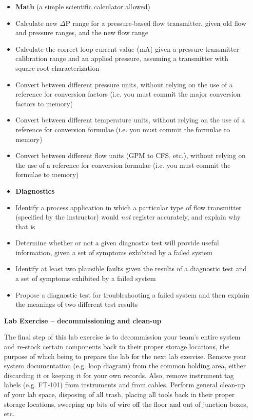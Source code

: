 \begin{itemize}
\item{} {\bf Math} (a simple scientific calculator  allowed)
\item{} Calculate new $\Delta$P range for a pressure-based flow transmitter, given old flow and pressure ranges, and the new flow range
\item{} Calculate the correct loop current value (mA) given a pressure transmitter calibration range and an applied pressure, assuming a transmitter with square-root characterization
\item{} Convert between different pressure units, without relying on the use of a reference for conversion factors (i.e. you must commit the major conversion factors to memory)
\item{} Convert between different temperature units, without relying on the use of a reference for conversion formulae (i.e. you must commit the formulae to memory)
\item{} Convert between different flow units (GPM to CFS, etc.), without relying on the use of a reference for conversion formulae (i.e. you must commit the formulae to memory)
\end{itemize}

\filbreak

\begin{itemize}
\item{} {\bf Diagnostics}
\item{} Identify a process application in which a particular type of flow transmitter (specified by the instructor) would {\it not} register accurately, and explain why that is
\item{} Determine whether or not a given diagnostic test will provide useful information, given a set of symptoms exhibited by a failed system
\item{} Identify at least two plausible faults given the results of a diagnostic test and a set of symptoms exhibited by a failed system
\item{} Propose a diagnostic test for troubleshooting a failed system and then explain the meanings of two different test results
\end{itemize}



\vfil \eject

\noindent
{\bf Lab Exercise -- decommissioning and clean-up}

\vskip 5pt

The final step of this lab exercise is to decommission your team's entire system and re-stock certain components back to their proper storage locations, the purpose of which being to prepare the lab for the next lab exercise.  Remove your system documentation (e.g. loop diagram) from the common holding area, either discarding it or keeping it for your own records.  Also, remove instrument tag labels (e.g. FT-101) from instruments and from cables.  Perform general clean-up of your lab space, disposing of all trash, placing all tools back in their proper storage locations, sweeping up bits of wire off the floor and out of junction boxes, etc.

